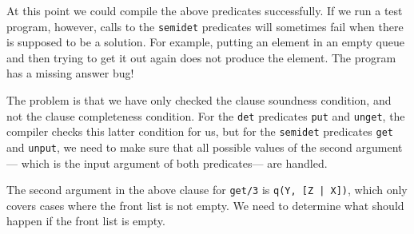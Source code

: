 At this point we could compile the above predicates successfully.
If we run a test program, however,
calls to the \texttt{semidet} predicates
will sometimes fail when there is supposed to be a solution.
For example,
putting an element in an empty queue
and then trying to get it out again
does not produce the element.
The program has a missing answer bug!

The problem is that we have only checked
the clause soundness condition,
and not the clause completeness condition.
For the \texttt{det} predicates \texttt{put} and \texttt{unget},
the compiler checks this latter condition for us,
but for the \texttt{semidet} predicates \texttt{get} and \texttt{unput},
we need to make sure that
all possible values of the second argument---%
which is the input argument of both predicates---%
are handled.

The second argument in the above clause for \texttt{get/3}
is \texttt{q(Y, [Z | X])},
which only covers cases where the front list is not empty.
We need to determine what should happen if the front list is empty.

